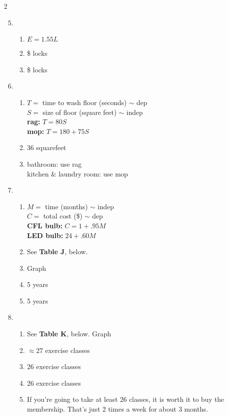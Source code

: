 \begin{multicols} {2}
\begin{enumerate}
\setcounter{enumi}{4}

\item %
\begin{enumerate}
\item $E=1.55L$
\item \$ locks
\item \$ locks
\end{enumerate}

\item %
\begin{enumerate}
\item $T=$ time to wash floor (seconds) $\sim$ dep \\ $S=$ size of floor (square feet) $\sim$ indep \\ \textbf{rag:} $T = 80S$ \\ \textbf{mop:} $T=180+75S$
\item 36 squarefeet
\item bathroom: use rag \\ kitchen \& laundry room: use mop
\end{enumerate}

\item %
\begin{enumerate}
\item $M=$ time (months) $\sim$ indep \\ $C=$ total cost (\$) $\sim$ dep \\ \textbf{CFL bulb:} $C = 1+.95M$ \\ \textbf{LED bulb:} $24 + .60M$
\item See \textbf{Table J}, below.
\item Graph
\item 5 years
\item 5 years
\end{enumerate}

\item %
\begin{enumerate}
\item See \textbf{Table K}, below.  Graph
\item $\approx 27$ exercise classes
\item 26 exercise classes
\item 26 exercise classes
\item If you're going to take at least 26 classes, it is worth it to buy the membership.  That's just 2 times a week for about 3 months.
\end{enumerate}


\end{enumerate}
\end{multicols}
